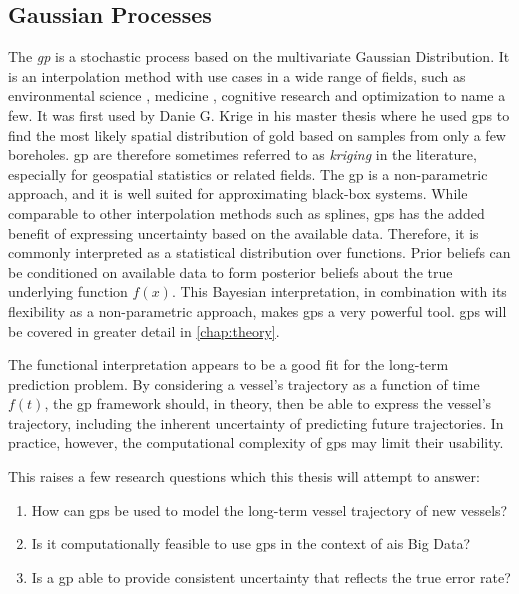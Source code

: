 \subsection{Gaussian Processes}
The \textit{\acrfull{gp}} is a stochastic process based on the multivariate Gaussian Distribution. It is an interpolation method with use cases in a wide range of fields, such as environmental science \cite{kriging}, medicine \cite{medical_gp,medicine_gp_2}, cognitive research \cite{gp_cognitive} and optimization \cite{brochu2010tutorial} to name a few. It was first used by Danie G. Krige in his master thesis \cite{krige1951statistical} where he used \acrshort{gp}s to find the most likely spatial distribution of gold based on samples from only a few boreholes. \acrshort{gp} are therefore sometimes referred to as \textit{kriging} in the literature, especially for geospatial statistics or related fields. 
The \acrshort{gp} is a non-parametric approach, and it is well suited for approximating black-box systems. While comparable to other interpolation methods such as splines, \acrshort{gp}s has the added benefit of expressing uncertainty based on the available data. Therefore, it is commonly interpreted as a statistical distribution over functions. Prior beliefs can be conditioned on available data to form posterior beliefs about the true underlying function $f(x)$. This Bayesian interpretation, in combination with its flexibility as a non-parametric approach, makes \acrshort{gp}s a very powerful tool. \acrshort{gp}s will be covered in greater detail in \cref{chap:theory}. 

The functional interpretation appears to be a good fit for the long-term prediction problem. By considering a vessel's trajectory as a function of time $f(t)$, the \acrshort{gp} framework should, in theory, then be able to express the vessel's trajectory, including the inherent uncertainty of predicting future trajectories. In practice, however, the computational complexity of \acrshort{gp}s may limit their usability.  

This raises a few research questions which this thesis will attempt to answer:
\begin{enumerate}
	\item How can \acrshort{gp}s be used to model the long-term vessel trajectory of new vessels?   
	\item Is it computationally feasible to use \acrshort{gp}s in the context of \acrshort{ais} Big Data?
	\item Is a \acrshort{gp} able to provide consistent uncertainty that reflects the true error rate?
\end{enumerate}

